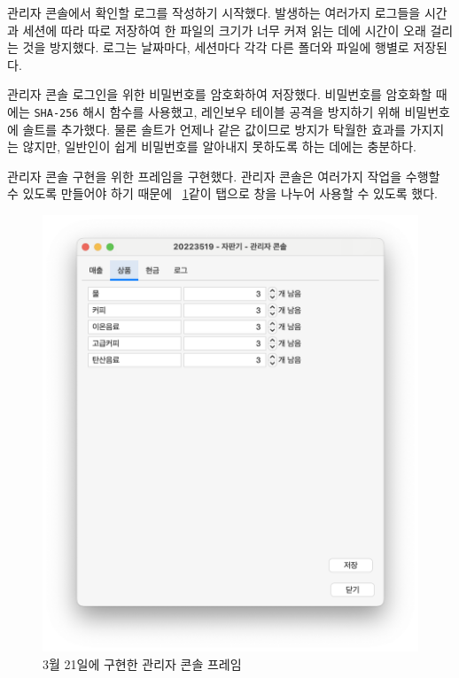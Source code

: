 \documentclass{oblivoir}
\newcommand{\figref}[1]{\figurename~\ref{#1}}
\begin{document}
    관리자 콘솔에서 확인할 로그를 작성하기 시작했다.
    발생하는 여러가지 로그들을 시간과 세션에 따라 따로 저장하여 한 파일의 크기가 너무 커져 읽는 데에 시간이 오래 걸리는 것을 방지했다.
    로그는 날짜마다, 세션마다 각각 다른 폴더와 파일에 행별로 저장된다.

    관리자 콘솔 로그인을 위한 비밀번호를 암호화하여 저장했다.
    비밀번호를 암호화할 때에는 \texttt{SHA-256} 해시 함수를 사용했고,
    레인보우 테이블 공격을 방지하기 위해 비밀번호에 솔트를 추가했다.
    물론 솔트가 언제나 같은 값이므로 방지가 탁월한 효과를 가지지는 않지만,
    일반인이 쉽게 비밀번호를 알아내지 못하도록 하는 데에는 충분하다.

    관리자 콘솔 구현을 위한 프레임을 구현했다.
    관리자 콘솔은 여러가지 작업을 수행할 수 있도록 만들어야 하기 때문에
    \figref{fig:0321-admin-console}\와 같이 탭으로 창을 나누어 사용할 수 있도록 했다.
    \begin{figure}[h]
        \centering
        \includegraphics[width=\textwidth]{0321-admin-console.png}
        \caption{3월 21일에 구현한 관리자 콘솔 프레임}
        \label{fig:0321-admin-console}
    \end{figure}
\end{document}
